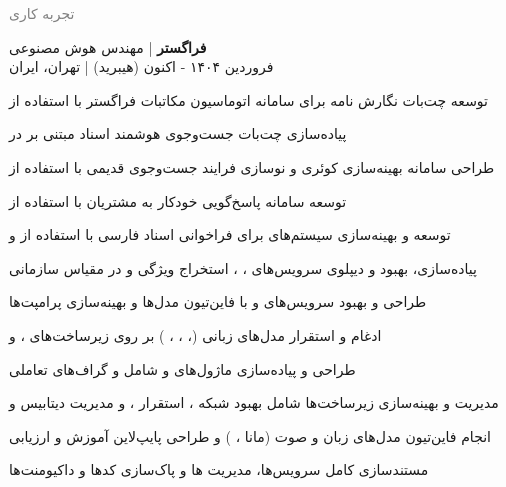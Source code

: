 \documentclass[a4paper]{deedy-persian} %
\begin{document}
\begin{minipage}[t]{0.62\textwidth} %
\footnotesize

\setlength{\itemsep}{5pt} %
\setlength{\topsep}{10pt} %

\textcolor{gray}{\huge {تجربه کاری}}
\vspace{\topsep} %

\textbf{فراگستر} | مهندس هوش مصنوعی \\
\vspace{\itemsep} 
فروردین ۱۴۰۴ - اکنون (هیبرید) | تهران، ایران
\begin{RTL}
\begin{tightitemize}
\item توسعه چت‌بات نگارش نامه برای سامانه اتوماسیون مکاتبات فراگستر با استفاده از 
\item پیاده‌سازی چت‌بات جست‌وجوی هوشمند اسناد مبتنی بر  در 
\item طراحی سامانه بهینه‌سازی کوئری و نوسازی فرایند جست‌وجوی قدیمی با استفاده از 
\item توسعه سامانه پاسخ‌گویی خودکار به مشتریان با استفاده از 
\item توسعه و بهینه‌سازی سیستم‌های  برای فراخوانی اسناد فارسی با استفاده از  و 
\item پیاده‌سازی، بهبود و دیپلوی سرویس‌های ، ، استخراج ویژگی و  در مقیاس سازمانی
\item طراحی و بهبود سرویس‌های  و  با فاین‌تیون مدل‌ها و بهینه‌سازی پرامپت‌ها
\item ادغام و استقرار مدل‌های زبانی (، ، ، ) بر روی زیرساخت‌های ،  و 
\item طراحی و پیاده‌سازی ماژول‌های  و  شامل  و گراف‌های تعاملی
\item مدیریت و بهینه‌سازی زیرساخت‌ها شامل بهبود شبکه ، استقرار ، و مدیریت دیتابیس  و 
\item انجام فاین‌تیون مدل‌های زبان و صوت (مانا ، ) و طراحی پایپ‌لاین آموزش و ارزیابی
\item مستندسازی کامل سرویس‌ها، مدیریت ها و پاک‌سازی کدها و داکیومنت‌ها
\end{tightitemize}
\end{RTL}
\vspace{\topsep}


\end{minipage}
\end{document}
